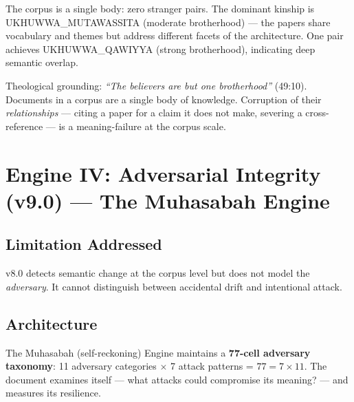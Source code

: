 \documentclass[11pt,a4paper]{article}
\begin{document}
The corpus is a single body: zero stranger pairs. The dominant kinship is UKHUWWA\_MUTAWASSITA (moderate brotherhood) --- the papers share vocabulary and themes but address different facets of the architecture. One pair achieves UKHUWWA\_QAWIYYA (strong brotherhood), indicating deep semantic overlap.

Theological grounding: \textit{``The believers are but one brotherhood''} (49:10). Documents in a corpus are a single body of knowledge. Corruption of their \textit{relationships} --- citing a paper for a claim it does not make, severing a cross-reference --- is a meaning-failure at the corpus scale.


\section{Engine IV: Adversarial Integrity (v9.0) --- The Muhasabah Engine}

\subsection{Limitation Addressed}

v8.0 detects semantic change at the corpus level but does not model the \textit{adversary}. It cannot distinguish between accidental drift and intentional attack.

\subsection{Architecture}

The Muhasabah (self-reckoning) Engine maintains a \textbf{77-cell adversary taxonomy}: 11 adversary categories $\times$ 7 attack patterns = $77 = 7 \times 11$. The document examines itself --- what attacks could compromise its meaning? --- and measures its resilience.
\end{document}
